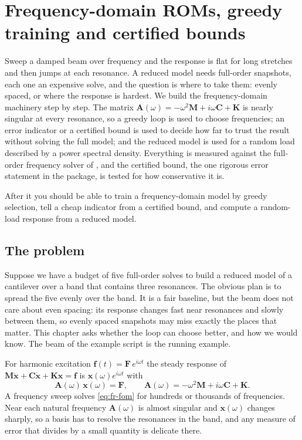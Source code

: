 \chapter{Frequency-domain ROMs, greedy training and certified bounds}\label{ch:freq}

\begin{tcolorbox}[colback=gray!5,colframe=gray!50,title={In this chapter}]
Sweep a damped beam over frequency and the response is flat for long stretches and then jumps at each resonance. A reduced model needs full-order snapshots, each one an expensive solve, and the question is where to take them: evenly spaced, or where the response is hardest. We build the frequency-domain machinery step by step. The matrix $\bm A(\omega)=-\omega^2\bm M+i\omega\bm C+\bm K$ is nearly singular at every resonance, so a greedy loop is used to choose frequencies; an error indicator or a certified bound is used to decide how far to trust the result without solving the full model; and the reduced model is used for a random load described by a power spectral density. Everything is measured against the full-order frequency solver of \fea{}, and the certified bound, the one rigorous error statement in the package, is tested for how conservative it is.\par\smallskip
After it you should be able to train a frequency-domain model by greedy selection, tell a cheap indicator from a certified bound, and compute a random-load response from a reduced model.
\end{tcolorbox}

\section{The problem}\label{sec:fr-problem}

Suppose we have a budget of five full-order solves to build a reduced model of a cantilever over a band that contains three resonances. The obvious plan is to spread the five evenly over the band. It is a fair baseline, but the beam does not care about even spacing: its response changes fast near resonances and slowly between them, so evenly spaced snapshots may miss exactly the places that matter. This chapter asks whether the loop can choose better, and how we would know. The beam of the example script is the running example.

For harmonic excitation $\bm f(t)=\bm F\,e^{i\omega t}$ the steady response of $\bm M\ddot{\bm x}+\bm C\dot{\bm x}+\bm K\bm x=\bm f$ is $\bm x(\omega)e^{i\omega t}$ with
\begin{equation}\label{eq:fr-fom}
\bm A(\omega)\,\bm x(\omega)=\bm F,\qquad \bm A(\omega)=-\omega^2\bm M+i\omega\bm C+\bm K .
\end{equation}
A frequency sweep solves \eqref{eq:fr-fom} for hundreds or thousands of frequencies. Near each natural frequency $\bm A(\omega)$ is almost singular and $\bm x(\omega)$ changes sharply, so a basis has to resolve the resonances in the band, and any measure of error that divides by a small quantity is delicate there.

